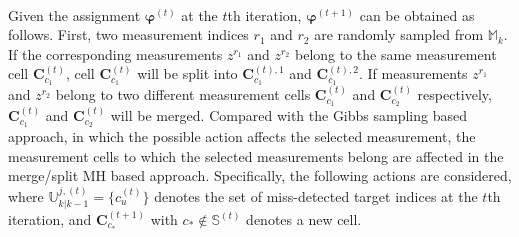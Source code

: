 ~\\
Given the assignment $\boldsymbol{\varphi}^{(t)}$ at the $t$th iteration, $\boldsymbol{\varphi}^{(t+1)}$ can be obtained as follows. First, two measurement indices $r_1$ and $r_2$ are randomly sampled from $\mathbb{M}_k$. If the corresponding measurements $z^{r_1}$ and $z^{r_2}$ belong to the same measurement cell $\mathbf{C}_{c_1}^{(t)}$, cell $\mathbf{C}_{c_1}^{(t)}$ will be split into $\mathbf{C}_{c_1}^{(t),1}$ and $\mathbf{C}_{c_1}^{(t),2}$. If measurements $z^{r_1}$ and $z^{r_2}$ belong to two different measurement cells $\mathbf{C}_{c_1}^{(t)}$ and $\mathbf{C}_{c_2}^{(t)}$ respectively, $\mathbf{C}_{c_1}^{(t)}$ and $\mathbf{C}_{c_2}^{(t)}$ will be merged. Compared with the Gibbs sampling based approach, in which the possible action affects the selected measurement, the measurement cells to which the selected measurements belong are affected in the merge/split MH based approach. Specifically, the following actions are considered, where $\mathbb{U}^{j,(t)}_{k|k-1}=\{c_u^{(t)}\}$ denotes the set of miss-detected target indices at the $t$th iteration, and $\mathbf{C}_{c_*}^{(t+1)}$ with $c_*\notin\mathbb{S}^{(t)}$ denotes a new cell. 
